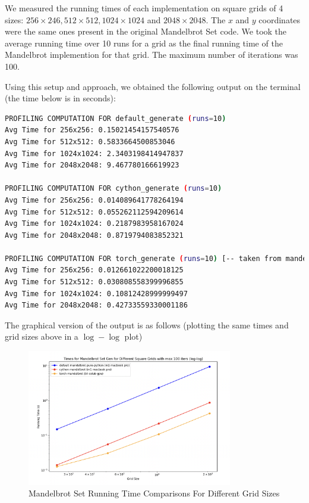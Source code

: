 \documentclass[a4paper,12pt]{article}
\begin{document}
We measured the running times of each implementation on square grids of 4 sizes: $256 \times 246, 512 \times 512, 1024 \times 1024$ and $2048 \times 2048$. The $x$ and $y$ coordinates were the same ones present in the original Mandelbrot Set code. We took the average running time over 10 runs for a grid as the final running time of the Mandelbrot implemention for that grid. The maximum number of iterations was 100. 

Using this setup and approach, we obtained the following output on the terminal (the time below is in seconds): 

\begin{lstlisting}[language=bash,basicstyle=\tiny\ttfamily]
PROFILING COMPUTATION FOR default_generate (runs=10)
Avg Time for 256x256: 0.15021454157540576
Avg Time for 512x512: 0.5833664500853046
Avg Time for 1024x1024: 2.3403198414947837
Avg Time for 2048x2048: 9.467780166619923

PROFILING COMPUTATION FOR cython_generate (runs=10)
Avg Time for 256x256: 0.014089641778264194
Avg Time for 512x512: 0.055262112594209614
Avg Time for 1024x1024: 0.2187983958167024
Avg Time for 2048x2048: 0.8719794083852321

PROFILING COMPUTATION FOR torch_generate (runs=10) [-- taken from mandelbrot_torch.ipynb notebook]
Avg Time for 256x256: 0.012661022200018125
Avg Time for 512x512: 0.030808558399996855
Avg Time for 1024x1024: 0.10812428999999497
Avg Time for 2048x2048: 0.42733559330001186
\end{lstlisting}

The graphical version of the output is as follows (plotting the same times and grid sizes above in a $\log - \log$ plot)
\begin{figure}[H]
  \centering
  \includegraphics[width=0.8\textwidth]{images/bonus_comparison.png}
  \caption{Mandelbrot Set Running Time Comparisons For Different Grid Sizes}
\end{figure}
\end{document}
